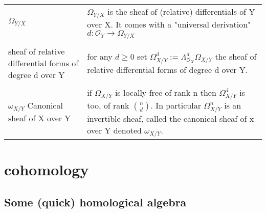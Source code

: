 \documentclass[a4paper, 12pt]{article}
\newcommand{\ox}{\mathcal{O}_X}
\newcommand{\oy}{\mathcal{O}_Y}
\begin{document}
\begin{longtable}{p{}  p{} } 
	$\Omega_{Y/X}$ & $\Omega_{Y/X}$ is the sheaf of (relative) differentials of Y over X.  It comes with a "universal derivation"  $d:\oy \longrightarrow \Omega_{Y/X}$\\
	
	&\\
	
	sheaf of relative differential forms of degree d over Y & for any $d \geq 0$ set $\Omega_{X/Y}^d := \Lambda^d_{\ox} \Omega_{X/Y}$ the sheaf of relative differential forms of degree d over Y.\\
	
	&\\
	
	$\omega_{X/Y}$ Canonical sheaf of X over Y & if $\Omega_{X/Y}$ is locally free of rank n then $\Omega_{X/Y}^d$ is too, of rank $n\choose d$. In particular $\Omega_{X/Y}^n$ is an invertible sheaf, called the canonical sheaf of x over Y denoted $\omega_{X/Y}$.
	
	&\\
	
	
	
\end{longtable}

\section{cohomology}

\subsection{Some (quick) homological algebra}

\begin{longtable}{p{}  p{} }
	
	
	
\end{longtable}



\begin{tabular}{p{4cm} p{11cm}}


  \end{tabular}

\begin{tabular}{p{4cm} p{11cm}}


  \end{tabular}

\begin{tabular}{p{4cm} p{11cm}}


  \end{tabular}

\begin{tabular}{p{4cm} p{11cm}}


  \end{tabular}
\end{document}
